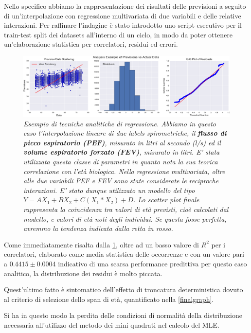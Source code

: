 \documentclass[12pt,openright,twoside,a4paper]{book}
\begin{document}
Nello specifico abbiamo la rappresentazione dei risultati delle previsioni a seguito di un'interpolazione con regressione multivariata di due variabili e delle relative interazioni.
Per raffinare l'indagine è stato introdotto uno script esecutivo per il train-test split dei datasets all'interno di un ciclo, in modo da poter ottenere un'elaborazione statistica per correlatori, residui ed errori.

\begin{figure}[!h]
\centering
\includegraphics[width=1.2\linewidth]{mulregression}
\caption{\textit{Esempio di tecniche analitiche di regressione. Abbiamo in questo caso l'interpolazione lineare di due labels spirometriche, il \textbf{flusso di picco espiratorio (PEF)}, misurato in litri al secondo (l/s) ed il \textbf{volume espiratorio forzato (FEV)}, misurato in litri. E' stata utilizzata questa classe di parametri in quanto nota la sua teorica correlazione con l'età biologica. Nella regressione multivariata, oltre alle due variabili PEF e FEV sono state considerate le reciproche interazioni. E' stato dunque utilizzato  un modello del tipo $Y=AX_1+BX_2+C(X_1*X_2)+D$. Lo scatter plot finale rappresenta la coincidenza tra valori di età previsti, cioè calcolati dal modello, e valori di età noti degli individui. Se questa fosse perfetta, avremmo la tendenza indicata dalla retta in rosso.}}
\label{mulregression}
\end{figure}

Come immediatamente risalta dalla \ref{mulregression}, oltre ad un basso valore di $R^2$ per i correlatori, elaborato come media statistica delle occorrenze e con un valore pari a $0.4415\pm0.0004$ indicativo di una scarsa performance predittiva per questo caso analitico, la distribuzione dei residui è molto piccata.

Quest'ultimo fatto è sintomatico dell'effetto di troncatura deterministica dovuto al criterio di selezione dello span di età, quantificato nella \ref{finalgraph}.

Si ha in questo modo la perdita delle condizioni di normalità della distribuzione necessaria all'utilizzo del metodo dei mini quadrati nel calcolo del MLE.
\end{document}
